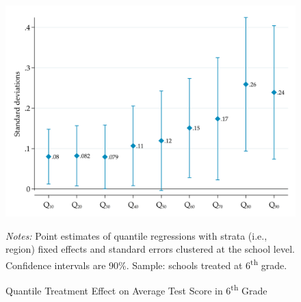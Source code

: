 \documentclass[11pt,a4paper]{article}
\begin{document}
\begin{figure}[htbp]
    
    \caption{Quantile Treatment Effect on Average Test Score  in 6\textsuperscript{th} Grade}
    \label{fig:qreg_media_grade6}
    \centering
    \includegraphics[width=14cm]{DataWork/Output/Figures/figA2-qreg_media_grade6.png}
    
    \begin{minipage}{0.825\textwidth}
        \small{\textit{Notes:} Point estimates of quantile regressions with strata (i.e., region) fixed effects and standard errors clustered at the school level. Confidence intervals are 90\%. Sample: schools treated at 6\textsuperscript{th} grade.}
    \end{minipage}
\end{figure}
\end{document}
